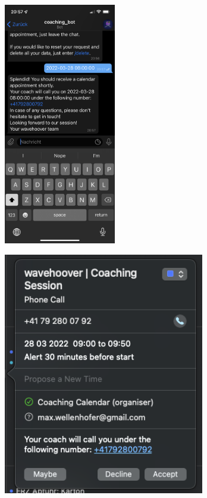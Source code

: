 	\begin{figure}
		\centering
		\begin{minipage}{.48\linewidth}
			\centering
			{\includegraphics[width=\linewidth,height=300pt,keepaspectratio]{images/Screenshots/appointment-made.PNG}}
		
			{\includegraphics[width=\linewidth,height=300pt,keepaspectratio]{images/Screenshots/calendar-invite.png}}
		

\end{minipage}
\end{figure}
